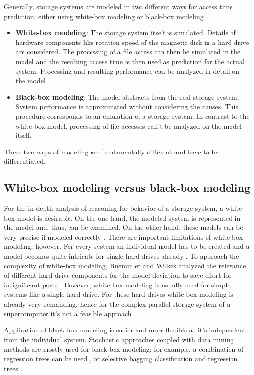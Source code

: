 \documentclass{superfri}
\begin{document}
	Generally, storage systems are modeled in two different ways for access time prediction; either using white-box modeling or black-box modeling~\cite{Crume:2013:FML:2538542.2538561}.
	\begin{itemize}
		\item \textbf{White-box modeling}: The storage system itself is simulated. 
		Details of hardware components like rotation speed of the magnetic disk in a hard drive are considered. 
		The processing of a file access can then be simulated in the model and the resulting access time is then used as prediction for the actual system.
		Processing and resulting performance can be analyzed in detail on the model.
		\item \textbf{Black-box modeling}: The model abstracts from the real storage system. 
		System performance is approximated without considering the causes.
		This procedure corresponds to an emulation of a storage system.
		In contrast to the white-box model, processing of file accesses can't be analyzed on the model itself.
	\end{itemize}
	These two ways of modeling are fundamentally different and have to be differentiated.
	
	\subsection{White-box modeling versus black-box modeling}
	For the in-depth analysis of reasoning for behavior of a storage system, a white-box-model is desirable.
	On the one hand, the modeled system is represented in the model and, thus, can be examined. 
	On the other hand, these models can be very precise if modeled correctly \cite{Ruemmler94anintroduction}.
	There are important limitations of white-box modeling, however. 
	For every system an individual model has to be created and a model becomes quite intricate for single hard drives already \cite{Crume:2013:FML:2538542.2538561}.
	To approach the complexity of white-box modeling, Ruemmler and Wilkes analyzed the relevance of different hard drive components for the model deviation to save effort for insignificant parts \cite{Ruemmler94anintroduction}.
	However, white-box modeling is usually used for simple systems like a single hard drive. For these hard drives white-box-modeling is already very demanding, hence for the complex parallel storage system of a supercomputer it's not a feasible approach \cite{DBLP:conf/npc/ZhangLZJC10}.
	
	Application of black-box-modeling is easier and more flexible as it's independent from the individual system.
	Stochastic approaches coupled with data mining methods are mostly used for black-box modeling; for example, a combination of regression trees can be used \cite{Dai:2012:SDP:2477169.2477214}, or selective bagging classification and regression trees \cite{DBLP:conf/npc/ZhangLZJC10}.
	
\end{document}
